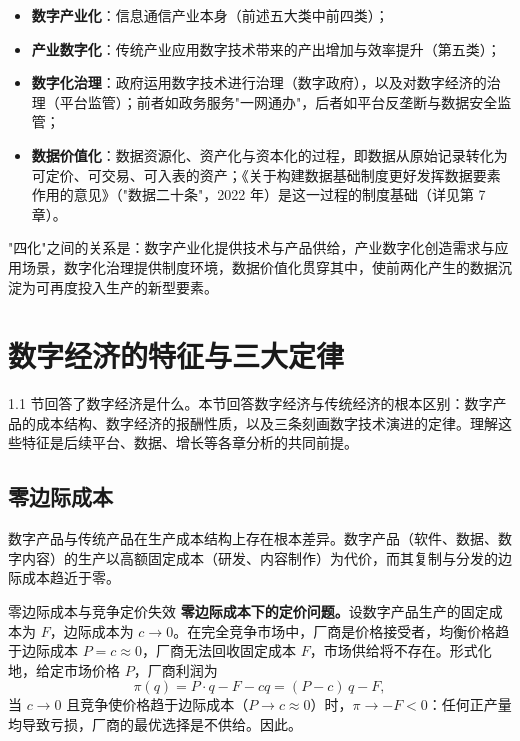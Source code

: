\begin{itemize}
\item \textbf{数字产业化}：信息通信产业本身（前述五大类中前四类）；
\item \textbf{产业数字化}：传统产业应用数字技术带来的产出增加与效率提升（第五类）；
\item \textbf{数字化治理}：政府运用数字技术进行治理（数字政府），以及对数字经济的治理（平台监管）；前者如政务服务"一网通办"，后者如平台反垄断与数据安全监管；
\item \textbf{数据价值化}：数据资源化、资产化与资本化的过程，即数据从原始记录转化为可定价、可交易、可入表的资产；《关于构建数据基础制度更好发挥数据要素作用的意见》（"数据二十条"，2022 年）是这一过程的制度基础（详见第 7 章）。
\end{itemize}

"四化"之间的关系是：数字产业化提供技术与产品供给，产业数字化创造需求与应用场景，数字化治理提供制度环境，数据价值化贯穿其中，使前两化产生的数据沉淀为可再度投入生产的新型要素。

\section{数字经济的特征与三大定律}

1.1 节回答了数字经济是什么。本节回答数字经济与传统经济的根本区别：数字产品的成本结构、数字经济的报酬性质，以及三条刻画数字技术演进的定律。理解这些特征是后续平台、数据、增长等各章分析的共同前提。

\subsection{零边际成本}

数字产品与传统产品在生产成本结构上存在根本差异。数字产品（软件、数据、数字内容）的生产以高额固定成本（研发、内容制作）为代价，而其复制与分发的边际成本趋近于零。

\begin{derivation}{零边际成本与竞争定价失效}{}
\textbf{零边际成本下的定价问题。}设数字产品生产的固定成本为 $F$，边际成本为 $c \to 0$。在完全竞争市场中，厂商是价格接受者，均衡价格趋于边际成本 $P = c \approx 0$，厂商无法回收固定成本 $F$，市场供给将不存在。形式化地，给定市场价格 $P$，厂商利润为
\[
\pi(q) = P \cdot q - F - cq = (P-c)\,q - F,
\]
当 $c \to 0$ 且竞争使价格趋于边际成本（$P \to c \approx 0$）时，$\pi \to -F < 0$：任何正产量均导致亏损，厂商的最优选择是不供给。因此。
\end{derivation}

